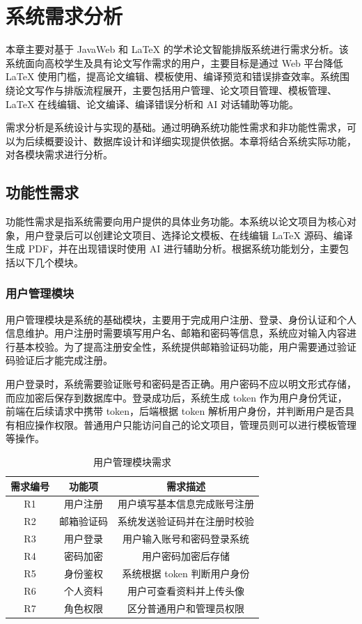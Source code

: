 \documentclass{xduugthesis}
\begin{document}
\chapter{系统需求分析}
本章主要对基于 JavaWeb 和 LaTeX 的学术论文智能排版系统进行需求分析。该系统面向高校学生及具有论文写作需求的用户，主要目标是通过 Web 平台降低 LaTeX 使用门槛，提高论文编辑、模板使用、编译预览和错误排查效率。系统围绕论文写作与排版流程展开，主要包括用户管理、论文项目管理、模板管理、LaTeX 在线编辑、论文编译、编译错误分析和 AI 对话辅助等功能。

需求分析是系统设计与实现的基础。通过明确系统功能性需求和非功能性需求，可以为后续概要设计、数据库设计和详细实现提供依据。本章将结合系统实际功能，对各模块需求进行分析。

\section{功能性需求}
功能性需求是指系统需要向用户提供的具体业务功能。本系统以论文项目为核心对象，用户登录后可以创建论文项目、选择论文模板、在线编辑 LaTeX 源码、编译生成 PDF，并在出现错误时使用 AI 进行辅助分析。根据系统功能划分，主要包括以下几个模块。

\subsection{用户管理模块}
用户管理模块是系统的基础模块，主要用于完成用户注册、登录、身份认证和个人信息维护。用户注册时需要填写用户名、邮箱和密码等信息，系统应对输入内容进行基本校验。为了提高注册安全性，系统提供邮箱验证码功能，用户需要通过验证码验证后才能完成注册。

用户登录时，系统需要验证账号和密码是否正确。用户密码不应以明文形式存储，而应加密后保存到数据库中。登录成功后，系统生成 token 作为用户身份凭证，前端在后续请求中携带 token，后端根据 token 解析用户身份，并判断用户是否具有相应操作权限。普通用户只能访问自己的论文项目，管理员则可以进行模板管理等操作。

\begin{table}[H]
    \centering
    \caption{用户管理模块需求}
    \label{tab:user-requirement}
    \begin{tabular}{|c|c|c|}
        \hline
        需求编号 & 功能项 & 需求描述 \\
        \hline
        R1 & 用户注册 & 用户填写基本信息完成账号注册 \\
        \hline
        R2 & 邮箱验证码 & 系统发送验证码并在注册时校验 \\
        \hline
        R3 & 用户登录 & 用户输入账号和密码登录系统 \\
        \hline
        R4 & 密码加密 & 用户密码加密后存储 \\
        \hline
        R5 & 身份鉴权 & 系统根据 token 判断用户身份 \\
        \hline
        R6 & 个人资料 & 用户可查看资料并上传头像 \\
        \hline
        R7 & 角色权限 & 区分普通用户和管理员权限 \\
        \hline
    \end{tabular}
\end{table}
\end{document}
